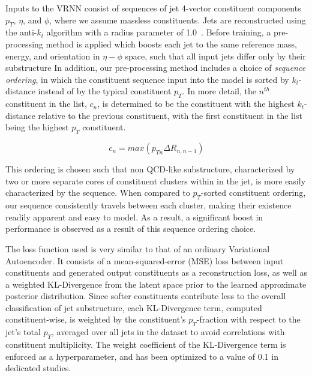 \documentclass[letterpaper,11pt]{article}
\begin{document}

Inputs to the VRNN consist of sequences of jet 4-vector constituent components $p_{T}$, $\eta$, and $\phi$, where we assume massless constituents. 
Jets are reconstructed using the anti-$k_t$ algorithm with a radius parameter of 1.0~\cite{Cacciari_2008}.
Before training, a pre-processing method is applied which boosts each jet to the same reference mass, energy, and orientation in $\eta-\phi$ space, such that all input jets differ only by their substructure
In addition, our pre-processing method includes a choice of \textit{sequence ordering}, in which the constituent sequence input into the model is sorted by $k_{t}$-distance instead of by the typical constituent $p_{T}$. 
In more detail, the $n^{th}$ constituent in the list, $c_{n}$, is determined to be the constituent with the highest $k_{t}$-distance relative to the previous constituent, with the first constituent in the list being the highest $p_{T}$ constituent. 

\begin{equation}
c_{n} = max(p_{Tn}\Delta R_{n, n-1})
\end{equation}

This ordering is chosen such that non QCD-like substructure, characterized by two or more separate cores of constituent clusters within in the jet, is more easily characterized by the sequence. 
When compared to $p_{T}$-sorted constituent ordering, our sequence consistently travels between each cluster, making their existence readily apparent and easy to model. As a result, a significant boost in performance is observed as a result of this sequence ordering choice. 

The loss function used is very similar to that of an ordinary Variational Autoencoder. 
It consists of a mean-squared-error (MSE) loss between input constituents and generated output constituents as a reconstruction loss, as well as a weighted KL-Divergence from the latent space prior to the learned approximate posterior distribution. 
Since softer constituents contribute less to the overall classification of jet substructure, each KL-Divergence term, computed constituent-wise, is weighted by the constituent's $p_{T}$-fraction with respect to the jet's total $p_{T}$, averaged over all jets in the dataset to avoid correlations with constituent multiplicity. 
The weight coefficient of the KL-Divergence term is enforced as a hyperparameter, and has been optimized to a value of 0.1 in dedicated studies. 
\end{document}
